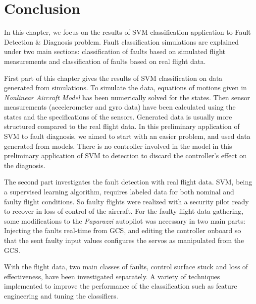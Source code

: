 \section{Conclusion}

In this chapter, we focus on the results of SVM classification application to Fault Detection \& Diagnosis problem. Fault classification simulations are explained under two main sections: classification of faults based on simulated flight measurements and classification of faults based on real flight data. 

First part of this chapter gives the results of SVM classification on data generated from simulations. 
To simulate the data, equations of motions given in \emph{Nonlinear Aircraft Model} has been numerically solved for the states. 
Then sensor measurements (accelerometer and gyro data) have been calculated using the states and the specifications of the sensors. 
Generated data is usually more structured compared to the real flight data. 
In this preliminary application of SVM to fault diagnosis, we aimed to start with an easier problem, and used data generated from models.
There is no controller involved in the model in this preliminary application of SVM to detection to discard the controller's effect on the diagnosis. 

The second part investigates the fault detection with real flight data. 
SVM, being a supervised learning algorithm, requires labeled data for both nominal and faulty flight conditions. 
So faulty flights were realized with a security pilot ready to recover in loss of control of the aircraft.
For the faulty flight data gathering, some modifications to the \emph{Paparazzi} autopilot was necessary in two main parts: Injecting the faults real-time from GCS, and editing the controller onboard so that the sent faulty input values configures the servos as manipulated from the GCS. 

With the flight data, two main classes of faults, control surface stuck and loss of effectiveness, have been investigated separately. 
A variety of techniques implemented to improve the performance of the classification such as feature engineering and tuning the classifiers. 
